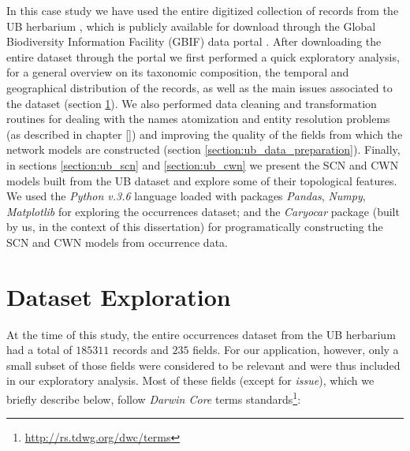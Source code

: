 In this case study we have used the entire digitized collection of records from the UB herbarium \cite{gbif_ubdataset}, which is publicly available for download through the Global Biodiversity Information Facility (GBIF) data portal \cite{gbif}. 
After downloading the entire dataset through the portal we first performed a quick exploratory analysis, for a general overview on its taxonomic composition, the temporal and geographical distribution of the records, as well as the main issues associated to the dataset (section \ref{section:ub_exploration}).
We also performed data cleaning and transformation routines for dealing with the names atomization and entity resolution problems (as described in chapter \ref{}) and improving the quality of the fields from which the network models are constructed (section \ref{section:ub_data_preparation}).
Finally, in sections \ref{section:ub_scn} and \ref{section:ub_cwn} we present the SCN and CWN models built from the UB dataset and explore some of their topological features. 
%
We used the \textit{Python v.3.6} language loaded with packages \textit{Pandas}, \textit{Numpy}, \textit{Matplotlib} for exploring the occurrences dataset; and the \textit{Caryocar} package (built by us, in the context of this dissertation) for programatically constructing the SCN and CWN models from occurrence data.





\section{Dataset Exploration}\label{section:ub_exploration}

At the time of this study, the entire occurrences dataset from the UB herbarium had a total of $185311$ records and $235$ fields.
For our application, however, only a small subset of those fields were considered to be relevant and were thus included in our exploratory analysis.
Most of these fields (except for \textit{issue}), which we briefly describe below, follow \textit{Darwin Core} terms standards\footnote{\url{http://rs.tdwg.org/dwc/terms}}:

